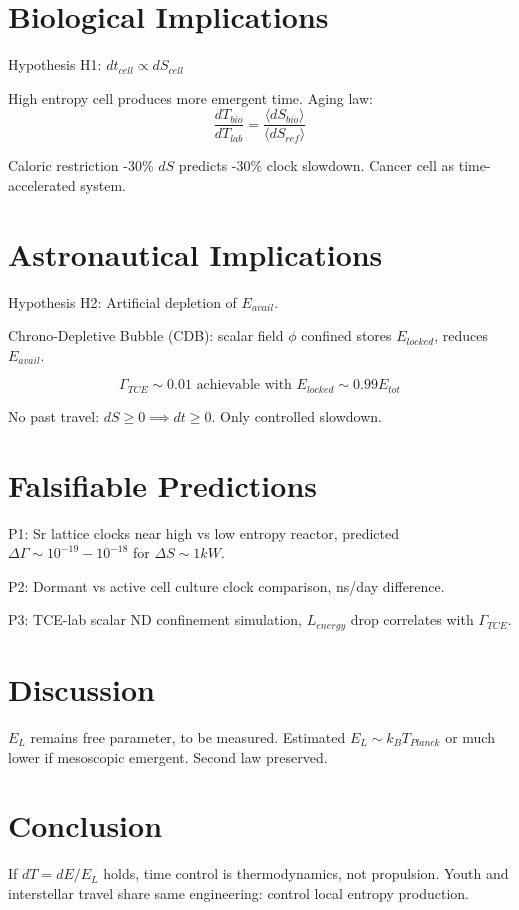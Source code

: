 \documentclass[11pt,a4paper]{article}
\begin{document}
\section{Biological Implications}
Hypothesis H1: $dt_{cell} \propto dS_{cell}$

High entropy cell produces more emergent time. Aging law:
$$ \frac{dT_{bio}}{dT_{lab}} = \frac{\langle dS_{bio}\rangle}{\langle dS_{ref}\rangle} $$

Caloric restriction -30\% $dS$ predicts -30\% clock slowdown. Cancer cell as time-accelerated system.

\section{Astronautical Implications}
Hypothesis H2: Artificial depletion of $E_{avail}$.

Chrono-Depletive Bubble (CDB): scalar field $\phi$ confined stores $E_{locked}$, reduces $E_{avail}$.

$$ \Gamma_{TCE} \sim 0.01 \text{ achievable with } E_{locked} \sim 0.99 E_{tot} $$

No past travel: $dS \ge 0 \implies dt \ge 0$. Only controlled slowdown.

\section{Falsifiable Predictions}
P1: Sr lattice clocks near high vs low entropy reactor, predicted $\Delta\Gamma \sim 10^{-19}-10^{-18}$ for $\Delta S \sim 1kW$.

P2: Dormant vs active cell culture clock comparison, ns/day difference.

P3: TCE-lab scalar ND confinement simulation, $L_{energy}$ drop correlates with $\Gamma_{TCE}$.

\section{Discussion}
$E_L$ remains free parameter, to be measured. Estimated $E_L \sim k_B T_{Planck}$ or much lower if mesoscopic emergent. Second law preserved.

\section{Conclusion}
If $dT=dE/E_L$ holds, time control is thermodynamics, not propulsion. Youth and interstellar travel share same engineering: control local entropy production.
\end{document}
